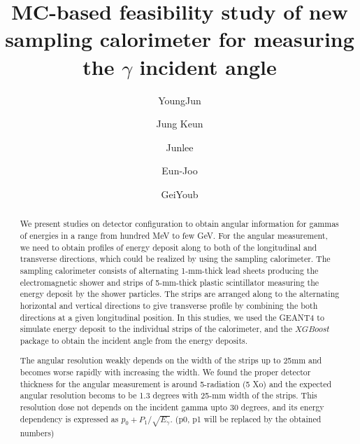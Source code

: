 \documentclass[jkps,preprint,fleqn,showpacs,showkeys]{revtex4}
\newcommand{\XGB}{XGBoost}
\begin{document}
\setcounter{page}{0}
\title[]{ MC-based feasibility study of new sampling calorimeter for measuring the $\gamma$ incident angle }

\author{YoungJun }
\author{Jung Keun }
\author{Junlee }
\author{Eun-Joo }
\author{GeiYoub  }


\begin{abstract}
We present studies on detector configuration to obtain angular information for gammas of energies in a range from hundred MeV to few GeV. For the angular measurement, we need to obtain profiles of energy deposit along to both of the longitudinal and transverse directions, which could be realized by using the sampling calorimeter. The sampling calorimeter consists of alternating 1-mm-thick lead sheets producing the electromagnetic shower and strips of 5-mm-thick plastic scintillator measuring the energy deposit by the shower particles. The strips are arranged along to the alternating horizontal and vertical directions to give transverse profile by combining the both directions at a given longitudinal position. In this studies, we used the GEANT4 to simulate energy deposit to the individual strips of the calorimeter, and the $\XGB$ package to obtain the incident angle from the energy deposits. 

The angular resolution weakly depends on the width of the strips up to 25mm and becomes worse rapidly with increasing the width. We found the proper detector thickness for the angular measurement is around 5-radiation (5 Xo) and the expected angular resolution becoms to be 1.3 degrees with 25-mm width of the strips. This resolution dose not depends on the incident gamma upto 30 degrees, and its energy dependency is expressed as $p_0 + P_1 / \sqrt{E_\gamma}$. (p0, p1 will be replaced by the obtained numbers) 


\end{abstract}
\end{document}
